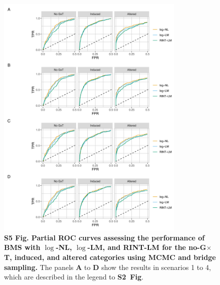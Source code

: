 \documentclass[11pt]{article}
\newcommand{\GxT}{G$\times$T\xspace}
\newcommand{\sfigroccmcmc}{\textbf{S2~Fig}\xspace}
\begin{document}
\begin{figure}[!ht]
\begin{center}
  \includegraphics[width=0.8\textwidth]{png/sim_procc_mcmc_bs.png}
\end{center}
\caption{
  {\bf
    S5 Fig.
    Partial ROC curves assessing the performance of BMS with $\log$-NL, $\log$-LM, and RINT-LM for the no-\GxT, induced, and altered categories using MCMC and bridge sampling.}
The panels \textbf{A} to \textbf{D} show the results in scenarios 1 to 4, which are described in the legend to \sfigroccmcmc.
}
\label{s-fig:sim-procc-mcmc}
\end{figure}
\end{document}
